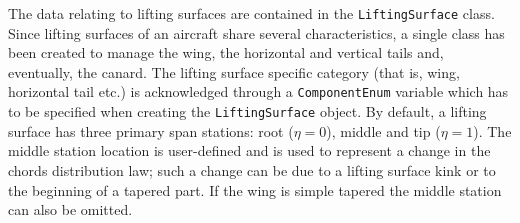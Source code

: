 \bigskip
\noindent
The data relating to lifting surfaces are contained in the \lstinline[language=Java]!LiftingSurface! class. Since lifting surfaces of an aircraft share several characteristics, a single class has been created to manage the wing, the horizontal and vertical tails and, eventually, the canard. The lifting surface specific category (that is, wing, horizontal tail etc.) is acknowledged through a \lstinline[language=Java]!ComponentEnum! variable which has to be specified when creating the \lstinline[language=Java]!LiftingSurface! object. By default, a lifting surface has three primary span stations: root ($\eta = 0$), middle and tip ($\eta = 1$). The middle station location is user-defined and is used to represent a change in the chords distribution law; such a change can be due to a lifting surface kink or to the beginning of a tapered part. If the wing is simple tapered the middle station can also be omitted.

